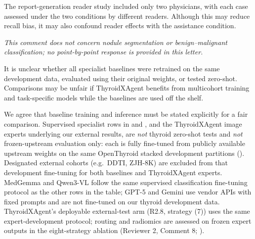 \begin{reviewercomment}
The report-generation reader study included only two physicians, with each case assessed under the two conditions by different readers. Although this may reduce recall bias, it may also confound reader effects with the assistance condition.
\end{reviewercomment}
\begin{authorresponse}
\noindent\textit{This comment does not concern nodule segmentation or benign--malignant classification; no point-by-point response is provided in this letter.}
\end{authorresponse}

\begin{reviewercomment}
It is unclear whether all specialist baselines were retrained on the same development data, evaluated using their original weights, or tested zero-shot. Comparisons may be unfair if ThyroidXAgent benefits from multicohort training and task-specific models while the baselines are used off the shelf.
\end{reviewercomment}
\begin{authorresponse}
We agree that baseline training and inference must be stated explicitly for a fair comparison. Supervised specialist rows in  and , and the ThyroidXAgent image experts underlying our external results, are \emph{not} thyroid zero-shot tests and \emph{not} frozen-upstream evaluation only: each is fully fine-tuned from publicly available upstream weights on the same OpenThyroid stacked development partitions (). Designated external cohorts (e.g.\ DDTI, ZJH-8K) are excluded from that development fine-tuning for both baselines and ThyroidXAgent experts. MedGemma and Qwen3-VL follow the same supervised classification fine-tuning protocol as the other rows in the table; GPT-5 and Gemini use vendor APIs with fixed prompts and are not fine-tuned on our thyroid development data. ThyroidXAgent's deployable external-test arm (R2.8, strategy (7)) uses the same expert-development protocol; routing and radiomics are assessed on frozen expert outputs in the eight-strategy ablation (Reviewer 2, Comment 8; ).\par
\par
\end{authorresponse}


